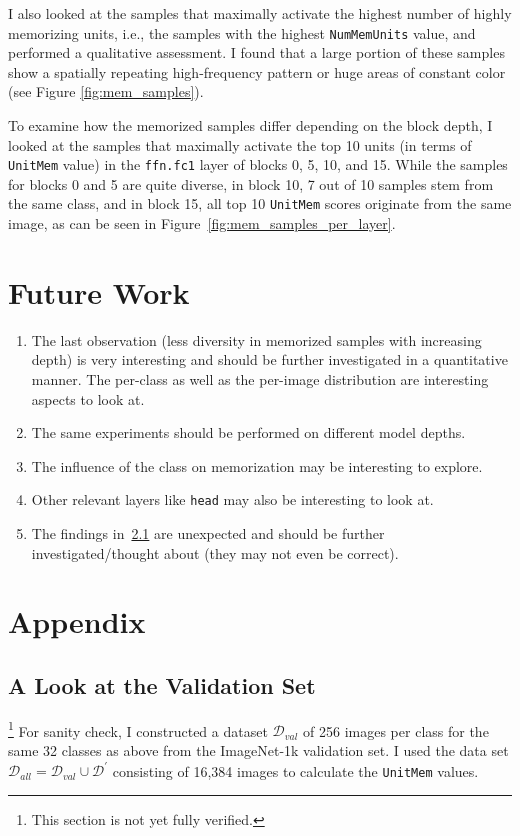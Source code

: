 \documentclass{article} %
\begin{document}
I also looked at the samples that maximally activate the highest number of highly memorizing units, i.e., the samples with the highest \texttt{NumMemUnits} value, and performed a qualitative assessment.
I found that a large portion of these samples show a spatially repeating high-frequency pattern or huge areas of constant color (see Figure \ref{fig:mem_samples}).

To examine how the memorized samples differ depending on the block depth, I looked at the samples that maximally activate the top 10 units (in terms of \texttt{UnitMem} value) in the \texttt{ffn.fc1} layer of blocks 0, 5, 10, and 15.
While the samples for blocks 0 and 5 are quite diverse, in block 10, 7 out of 10 samples stem from the same class, and in block 15, all top 10 \texttt{UnitMem} scores originate from the same image, as can be seen in Figure~\ref{fig:mem_samples_per_layer}.

\section{Future Work}
\begin{enumerate}
   \item The last observation (less diversity in memorized samples with increasing depth) is very interesting and should be further investigated in a quantitative manner.
   The per-class as well as the per-image distribution are interesting aspects to look at.
   \item The same experiments should be performed on different model depths.
   \item The influence of the class on memorization may be interesting to explore.
   \item Other relevant layers like \texttt{head} may also be interesting to look at.
   \item The findings in~\ref{look_at_val} are unexpected and should be further investigated/thought about (they may not even be correct).
\end{enumerate}






\newpage
\appendix
\section{Appendix}
\subsection{A Look at the Validation Set}\label{look_at_val}\footnote{This section is not yet fully verified.}
For sanity check, I constructed a dataset $\mathcal{D}_{val}$ of 256 images per class for the same 32 classes as above from the ImageNet-1k validation set.
I used the data set $\mathcal{D}_{all} = \mathcal{D}_{val} \cup \mathcal{D}^\prime$ consisting of 16,384 images to calculate the \texttt{UnitMem} values.
\end{document}

